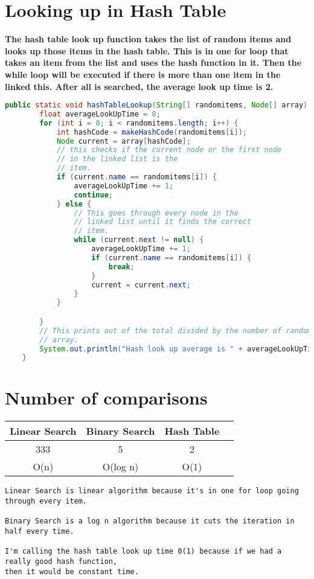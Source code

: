 \documentclass{article}
\begin{document}
\section{Looking up in Hash Table}
\textbf{ The hash table look up function takes the list of random items and looks up those items in the hash table. This is in one for loop that takes an item from the list and uses the hash function in it. Then the while loop will be executed if there is more than one item in the linked this. After all is searched, the average look up time is 2.}
\begin{lstlisting}[language = java]
public static void hashTableLookup(String[] randomitems, Node[] array) {
        float averageLookUpTime = 0;
        for (int i = 0; i < randomitems.length; i++) {
            int hashCode = makeHashCode(randomitems[i]);
            Node current = array[hashCode];
            // this checks if the current node or the first node
            // in the linked list is the
            // item.
            if (current.name == randomitems[i]) {
                averageLookUpTime += 1;
                continue;
            } else {
                // This goes through every node in the
                // linked list until it finds the correct
                // item.
                while (current.next != null) {
                    averageLookUpTime += 1;
                    if (current.name == randomitems[i]) {
                        break;
                    }
                    current = current.next;
                }
            }

        }
        // This prints out of the total divided by the number of random items in the
        // array.
        System.out.println("Hash look up average is " + averageLookUpTime / 42);
    }
\end{lstlisting}
\section{Number of comparisons}
\begin{center}
\begin{tabular}{||c c c c||} 
 \hline
Linear Search & Binary Search & Hash Table\\[0.5ex] 
 \hline\hline
 333 & 5 & 2 \\ 
 \hline
 O(n) & O(log n) & O(1) \\
 \hline
\end{tabular}
\end{center}
\begin{lstlisting}
Linear Search is linear algorithm because it's in one for loop going through every item.

Binary Search is a log n algorithm because it cuts the iteration in half every time.

I'm calling the hash table look up time 0(1) because if we had a really good hash function,
then it would be constant time.
\end{lstlisting}
\end{document}
